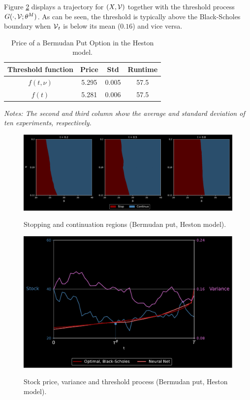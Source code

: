 Figure \cref{fig:heston2} displays a trajectory for $(X,\operatorname{\mathcal{V}})$ together with the threshold process $G(\cdot,\operatorname{\mathcal{V}};\theta^M)$. As can be seen, the threshold is typically above the Black-Scholes boundary when $\operatorname{\mathcal{V}}_t$ is below its mean ($0.16$) and vice versa. 

\begin{table}[ht]
  \centering
  \caption{Price of a Bermudan Put Option in the Heston model.   
 }
  \begin{tabular}{|c| c| c| c| }
 \hline
  Threshold function &  Price&  Std& Runtime  \\
  \hline 
    $f(t,\nu)$ & 5.295 & 0.005 &  57.5 \\
  $f(t)$ & 5.281 & 0.006 &  57.5  \\
  \hline
\end{tabular}
\vspace{2mm}

\scriptsize{
\textit{Notes: The second and third column show the average and standard deviation of ten experiments, respectively.  }}
\label{tab:resultPutHeston}
  \end{table}
  
\begin{figure}[t]
    \centering
     \caption{Stopping and continuation regions (Bermudan put, Heston model).}
    \includegraphics[scale = 0.42]{Figures/2DPlotHestonWide.pdf}
    \label{fig:heston1}
\end{figure}


\begin{figure}[t]
    \centering
     \caption{Stock price, variance and threshold process (Bermudan put, Heston model).}
    \includegraphics[scale = 0.42]{Figures/BdryHeston.pdf}
    \label{fig:heston2}
\end{figure}


